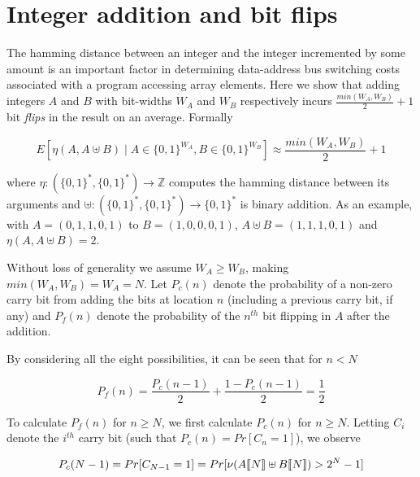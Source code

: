 \chapter{Integer addition and bit flips}

\label{AppendixC}


The hamming distance between an integer and the integer incremented by
some amount is an important factor in determining data-address bus
switching costs associated with a program accessing array elements.
Here we show that adding integers $A$ and $B$ with bit-widths $W_A$
and $W_B$ respectively incurs $\frac{min(W_A, W_B)}{2} + 1$ bit
\textit{flips} in the result on an average.  Formally

\begin{equation}
  E[\eta(A, A \uplus B) \mid A \in \{0, 1\}^{W_A}, B \in \{0,
    1\}^{W_B} ] \approx \frac{min(W_A, W_B)}{2} + 1
\end{equation}

where $\eta : (\{0, 1\}^*, \{0, 1\}^*) \to \mathbb{Z}$ computes the
hamming distance between its arguments and $\uplus : (\{0, 1\}^*, \{0,
1\}^*) \to \{0, 1\}^*$ is binary addition.  As an example, with $A =
(0, 1, 1, 0, 1)$ to $B = (1, 0, 0, 0, 1)$, $A \uplus B = (1, 1, 1, 0,
1)$ and $\eta(A, A \uplus B) = 2$.

Without loss of generality we assume $W_A \geq W_B$, making $min(W_A,
W_B) = W_A = N$.  Let $P_c(n)$ denote the probability of a non-zero
carry bit from adding the bits at location $n$ (including a previous
carry bit, if any) and $P_f(n)$ denote the probability of the $n^{th}$
bit flipping in $A$ after the addition.

By considering all the eight possibilities, it can be seen that for $n
< N$

\begin{equation}
    P_f(n) = \frac{P_c(n - 1)}{2} + \frac{1 - P_c(n - 1)}{2} =
    \frac{1}{2}
\end{equation}

To calculate $P_f(n)$ for $n \geq N$, we first calculate $P_c(n)$ for
$n \geq N$.  Letting $C_i$ denote the $i^{th}$ carry bit (such that
$P_c(n) = Pr[C_n = 1]$), we observe

\begin{equation}
  P_c(N - 1) = Pr[C_{N - 1} = 1] = Pr[\nu(A\llbracket N \rrbracket  \uplus
    B\llbracket N \rrbracket ) > 2^N - 1]
\end{equation}


